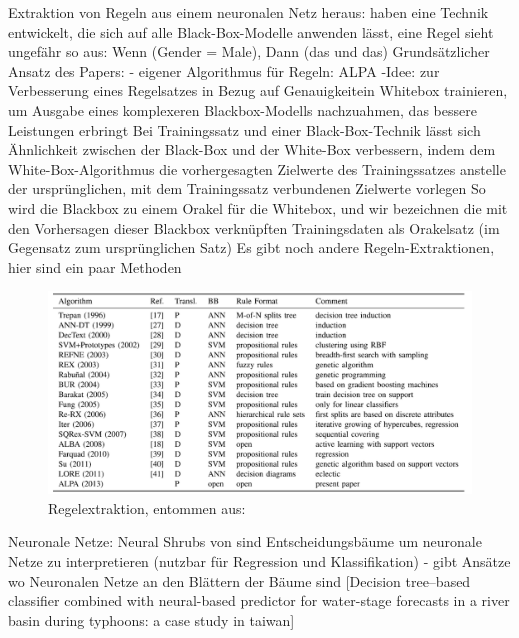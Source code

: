 Extraktion von Regeln aus einem neuronalen Netz heraus: \cite{de2015active} haben eine Technik entwickelt, die sich auf alle Black-Box-Modelle anwenden lässt, eine Regel sieht ungefähr so aus: Wenn (Gender = Male), Dann (das und das)
Grundsätzlicher Ansatz des Papers: - eigener Algorithmus für Regeln: ALPA -Idee: zur Verbesserung eines Regelsatzes in Bezug auf Genauigkeitein Whitebox trainieren, um Ausgabe eines komplexeren Blackbox-Modells nachzuahmen, das bessere Leistungen erbringt Bei Trainingssatz und einer Black-Box-Technik lässt sich Ähnlichkeit zwischen der Black-Box und der White-Box verbessern, indem dem White-Box-Algorithmus die vorhergesagten Zielwerte des Trainingssatzes anstelle der ursprünglichen, mit dem Trainingssatz verbundenen Zielwerte vorlegen  So wird die Blackbox zu einem Orakel für die Whitebox, und wir bezeichnen die mit den Vorhersagen dieser Blackbox verknüpften Trainingsdaten als Orakelsatz (im Gegensatz zum ursprünglichen Satz)
Es gibt noch andere Regeln-Extraktionen, hier sind ein paar Methoden
\begin{figure}
    \centering
    \includegraphics[scale=0.45]{pic/MA-Bilder/Literaturrecherche/27-RegelalgorithmenSurvey.PNG}
    \caption{Regelextraktion, entommen aus: \cite{de2015active}}
    \label{Fig:RegelextraktionAlg}
\end{figure}

Neuronale Netze: Neural Shrubs von \cite{caudle2019advanced} sind Entscheidungsbäume um neuronale Netze zu interpretieren (nutzbar für Regression und Klassifikation)
- gibt Ansätze wo Neuronalen Netze an den Blättern der Bäume sind [Decision tree–based classifier combined with neural-based predictor for water-stage forecasts in a river basin during typhoons: a case study in taiwan]

